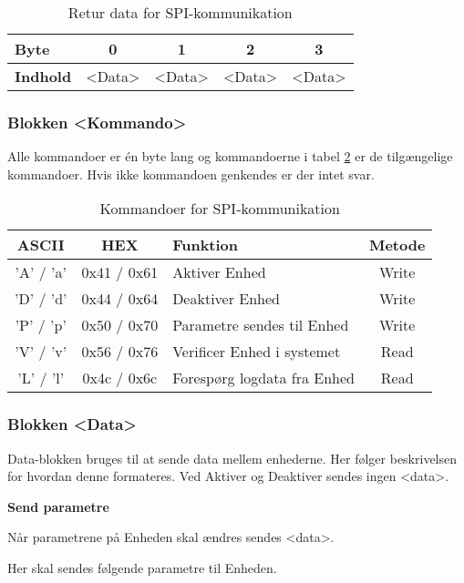 \begin{table}[h]
	\caption{Retur data for SPI-kommunikation}
	\centering
	\begin{tabular}{|l|c|c|c|c|}
		\hline 
		\textbf{Byte} & 0 & 1 & 2 & 3  \\ 
		\hline 
		\textbf{Indhold} & <Data> & <Data> & <Data> & <Data>  \\ 
		\hline 
	\end{tabular} 
	\label{table:SWProtokol-retur}
\end{table}


\subsubsection*{Blokken <Kommando>}
Alle kommandoer er én byte lang og kommandoerne i tabel \ref{tabel:SWProtokol-kommandoer} er de tilgængelige kommandoer. Hvis ikke kommandoen genkendes er der intet svar.

\begin{table}[H]
\caption{Kommandoer for SPI-kommunikation}
\centering
\begin{tabular}{|c|c|l|c|}
\hline 
\textbf{ASCII} & \textbf{HEX} & \textbf{Funktion} & \textbf{Metode}  \\ 
\hline 
'A' / 'a' & 0x41 / 0x61 & Aktiver Enhed & Write\\ 
\hline 
'D' / 'd' & 0x44 / 0x64 & Deaktiver Enhed & Write\\ 
\hline 
'P' / 'p' & 0x50 / 0x70 & Parametre sendes til Enhed & Write\\
\hline 
'V' / 'v' & 0x56 / 0x76 & Verificer Enhed i systemet & Read\\ 
\hline
'L' / 'l' & 0x4c / 0x6c & Forespørg logdata fra Enhed & Read\\ 
\hline
\end{tabular}
\label{tabel:SWProtokol-kommandoer}
\end{table} 

\subsubsection*{Blokken <Data>}
Data-blokken bruges til at sende data mellem enhederne. Her følger beskrivelsen for hvordan denne formateres.
Ved Aktiver og Deaktiver sendes ingen <data>. 

\textbf{Send parametre}

Når parametrene på Enheden skal ændres sendes <data>. 

Her skal sendes følgende parametre til Enheden.

